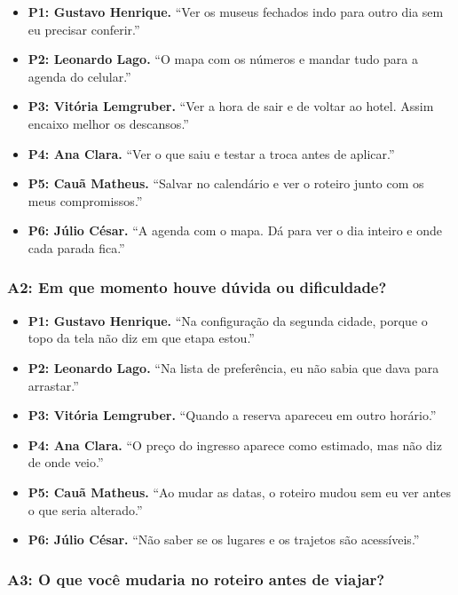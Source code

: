 \begin{itemize}
  \item \textbf{P1: Gustavo Henrique.} ``Ver os museus fechados indo para outro dia sem eu precisar conferir.''
  \item \textbf{P2: Leonardo Lago.} ``O mapa com os números e mandar tudo para a agenda do celular.''
  \item \textbf{P3: Vitória Lemgruber.} ``Ver a hora de sair e de voltar ao hotel. Assim encaixo melhor os descansos.''
  \item \textbf{P4: Ana Clara.} ``Ver o que saiu e testar a troca antes de aplicar.''
  \item \textbf{P5: Cauã Matheus.} ``Salvar no calendário e ver o roteiro junto com os meus compromissos.''
  \item \textbf{P6: Júlio César.} ``A agenda com o mapa. Dá para ver o dia inteiro e onde cada parada fica.''
\end{itemize}

\subsubsection{A2: Em que momento houve dúvida ou dificuldade?}

\begin{itemize}
  \item \textbf{P1: Gustavo Henrique.} ``Na configuração da segunda cidade, porque o topo da tela não diz em que etapa estou.''
  \item \textbf{P2: Leonardo Lago.} ``Na lista de preferência, eu não sabia que dava para arrastar.''
  \item \textbf{P3: Vitória Lemgruber.} ``Quando a reserva apareceu em outro horário.''
  \item \textbf{P4: Ana Clara.} ``O preço do ingresso aparece como estimado, mas não diz de onde veio.''
  \item \textbf{P5: Cauã Matheus.} ``Ao mudar as datas, o roteiro mudou sem eu ver antes o que seria alterado.''
  \item \textbf{P6: Júlio César.} ``Não saber se os lugares e os trajetos são acessíveis.''
\end{itemize}

\subsubsection{A3: O que você mudaria no roteiro antes de viajar?}

